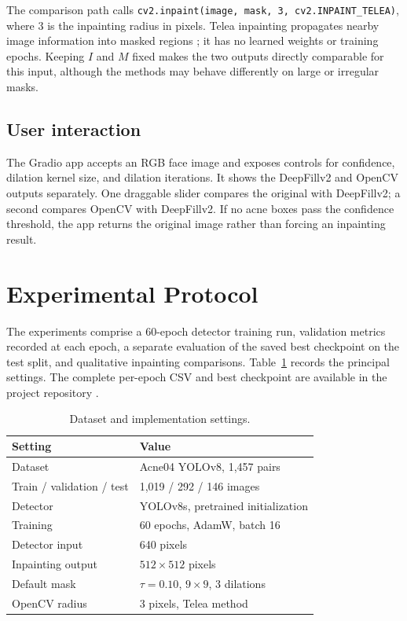 \documentclass[10pt,twocolumn,letterpaper]{article}
\begin{document}
The comparison path calls
\texttt{cv2.inpaint(image, mask, 3, cv2.INPAINT\_TELEA)}, where 3 is the
inpainting radius in pixels. Telea inpainting propagates nearby image
information into masked regions \cite{telea2004}; it has no learned
weights or training epochs. Keeping $I$ and $M$ fixed makes the two
outputs directly comparable for this input, although the methods may
behave differently on large or irregular masks.

\subsection{User interaction}

The Gradio app accepts an RGB face image and exposes controls for
confidence, dilation kernel size, and dilation iterations. It shows the
DeepFillv2 and OpenCV outputs separately. One draggable slider compares
the original with DeepFillv2; a second compares OpenCV with DeepFillv2.
If no acne boxes pass the confidence threshold, the app returns the
original image rather than forcing an inpainting result.

\section{Experimental Protocol}
\label{sec:experiments}

The experiments comprise a 60-epoch detector training run, validation
metrics recorded at each epoch, a separate evaluation of the saved best
checkpoint on the test split, and qualitative inpainting comparisons.
Table~\ref{tab:setup} records the principal settings. The complete
per-epoch CSV and best checkpoint are available in the project
repository \cite{projectrepo}.

\begin{table}[t]
    \centering
    \small
    \begin{tabular}{p{}p{}}
        \toprule
        Setting & Value\\
        \midrule
        Dataset & Acne04 YOLOv8, 1,457 pairs\\
        Train / validation / test & 1,019 / 292 / 146 images\\
        Detector & YOLOv8s, pretrained initialization\\
        Training & 60 epochs, AdamW, batch 16\\
        Detector input & 640 pixels\\
        Inpainting output & $512\times512$ pixels\\
        Default mask & $\tau=0.10$, $9\times9$, 3 dilations\\
        OpenCV radius & 3 pixels, Telea method\\
        \bottomrule
    \end{tabular}
    \caption{Dataset and implementation settings.}
    \label{tab:setup}
\end{table}
\end{document}
